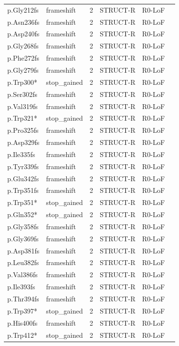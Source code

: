 \begin{footnotesize}
\begin{longtable}{llllll}
p.Gly212fs & frameshift & 2 & STRUCT-R & R0-LoF & \\
p.Asn236fs & frameshift & 2 & STRUCT-R & R0-LoF & \\
p.Asp240fs & frameshift & 2 & STRUCT-R & R0-LoF & \\
p.Gly268fs & frameshift & 2 & STRUCT-R & R0-LoF & \\
p.Phe272fs & frameshift & 2 & STRUCT-R & R0-LoF & \\
p.Gly279fs & frameshift & 2 & STRUCT-R & R0-LoF & \\
p.Trp300* & stop\_gained & 2 & STRUCT-R & R0-LoF & \\
p.Ser302fs & frameshift & 2 & STRUCT-R & R0-LoF & \\
p.Val319fs & frameshift & 2 & STRUCT-R & R0-LoF & \\
p.Trp321* & stop\_gained & 2 & STRUCT-R & R0-LoF & \\
p.Pro325fs & frameshift & 2 & STRUCT-R & R0-LoF & \\
p.Asp329fs & frameshift & 2 & STRUCT-R & R0-LoF & \\
p.Ile335fs & frameshift & 2 & STRUCT-R & R0-LoF & \\
p.Tyr339fs & frameshift & 2 & STRUCT-R & R0-LoF & \\
p.Glu342fs & frameshift & 2 & STRUCT-R & R0-LoF & \\
p.Trp351fs & frameshift & 2 & STRUCT-R & R0-LoF & \\
p.Trp351* & stop\_gained & 2 & STRUCT-R & R0-LoF & \\
p.Gln352* & stop\_gained & 2 & STRUCT-R & R0-LoF & \\
p.Gly358fs & frameshift & 2 & STRUCT-R & R0-LoF & \\
p.Gly369fs & frameshift & 2 & STRUCT-R & R0-LoF & \\
p.Asp381fs & frameshift & 2 & STRUCT-R & R0-LoF & \\
p.Leu382fs & frameshift & 2 & STRUCT-R & R0-LoF & \\
p.Val386fs & frameshift & 2 & STRUCT-R & R0-LoF & \\
p.Ile393fs & frameshift & 2 & STRUCT-R & R0-LoF & \\
p.Thr394fs & frameshift & 2 & STRUCT-R & R0-LoF & \\
p.Trp397* & stop\_gained & 2 & STRUCT-R & R0-LoF & \\
p.His400fs & frameshift & 2 & STRUCT-R & R0-LoF & \\
p.Trp412* & stop\_gained & 2 & STRUCT-R & R0-LoF & \\

\end{longtable}
\end{footnotesize}
